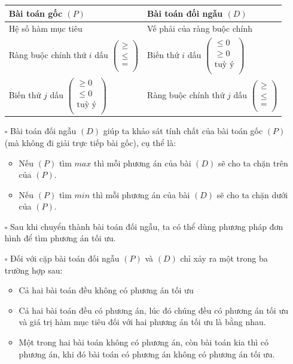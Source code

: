 \documentclass{article}
\begin{document}
\begin{itemize}
\begin{table}[!ht]
        \centering
        \begin{tabular}{|w{c}{6cm}|w{c}{6cm}|}
        \hline
            Bài toán gốc $(P)$ & Bài toán đối ngẫu $(D)$ \\ \hline
            Hệ số hàm mục tiêu & Vế phải của ràng buộc chính \\ \hline
            Ràng buộc chính thứ $i$ dấu $\left(\begin{array}{l} \geq \\ \leq \\= \\ \end{array}\right)$ & Biến thứ $i$ dấu $\left(\begin{array}{l} \leq 0 \\ \geq 0 \\ \text{tuỳ ý} \\ \end{array}\right)$ \\ \hline
            Biến thứ $j$ dấu $\left(\begin{array}{l} \geq 0 \\ \leq 0 \\ \text{tuỳ ý} \\ \end{array}\right)$ & Ràng buộc chính thứ $j$ dấu $\left(\begin{array}{l} \geq \\ \leq \\= \\ \end{array}\right)$ \\ \hline
        \end{tabular}
    \end{table}
    \item [$\square$] Bài toán đối ngẫu $(D)$ giúp ta khảo sát tính chất của bài toán gốc $(P)$ (mà không đi giải trực tiếp bài gốc), cụ thể là:
    \begin{itemize}[label=\textbullet]
        \item Nếu $(P)$ tìm $max$ thì mỗi phương án của bài $(D)$ sẽ cho ta chặn trên của $(P)$.
        \item Nếu $(P)$ tìm $min$ thì mỗi phương án của bài $(D)$ sẽ cho ta chặn dưới của $(P)$.
    \end{itemize}
    \item [$\square$] Sau khi chuyển thành bài toán đối ngẫu, ta có thể dùng phương pháp đơn hình để tìm phương án tối ưu.
    \item [$\square$] Đối với cặp bài toán đối ngẫu $(P)$ và $(D)$ chỉ xảy ra một trong ba trường hợp sau:
    \begin{itemize}[label=\textbullet]
        \item Cả hai bài toán đều không có phương án tối ưu
        \item Cả hai bài toán đều có phương án, lúc đó chúng đều có phương án tối ưu và giá trị hàm mục tiêu đối với hai phương án tối ưu là bằng nhau.
        \item Một trong hai bài toán không có phương án, còn bài toán kia thì có phương án, khi đó bài toán có phương án không có phương án tối ưu.
    \end{itemize}
\end{itemize}
\end{document}
